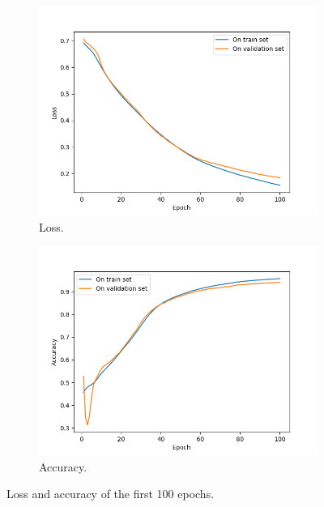 \documentclass[10pt, a4paper]{article}
\begin{document}
\begin{multicols}{2}
	\lipsum[1-3]
	\begin{figure}[htb] %
	  \centering
	  \begin{subfigure}[b]{0.3\linewidth}
	    \includegraphics[width=\linewidth]{Figure_1.png}
	    \caption{Loss.}
	  \end{subfigure}
	  \begin{subfigure}[b]{0.3\linewidth}
	    \includegraphics[width=\linewidth]{Figure_2.png}
	    \caption{Accuracy.}
	  \end{subfigure}
	  \caption{Loss and accuracy of the first 100 epochs.}
	  \label{fig:training}
	\end{figure}
	\lipsum[4]


\end{multicols}
\end{document}
